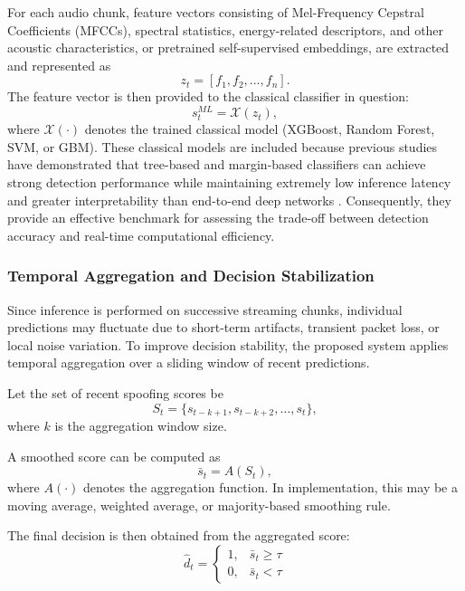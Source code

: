 For each audio chunk, feature vectors consisting of Mel-Frequency Cepstral Coefficients (MFCCs), spectral statistics, energy-related descriptors, and other acoustic characteristics, or pretrained self-supervised embeddings, are extracted and represented as
\begin{equation}
z_t = [f_1,f_2,\ldots,f_n].
\end{equation}
The feature vector is then provided to the classical classifier in question:
\begin{equation}
s_t^{ML} = \mathcal{X}(z_t),
\end{equation}
where $\mathcal{X}(\cdot)$ denotes the trained classical model (XGBoost, Random Forest, SVM, or GBM). These classical models are included because previous studies have demonstrated that tree-based and margin-based classifiers can achieve strong detection performance while maintaining extremely low inference latency and greater interpretability than end-to-end deep networks \cite{Bird2023}. Consequently, they provide an effective benchmark for assessing the trade-off between detection accuracy and real-time computational efficiency.

\subsubsection{Temporal Aggregation and Decision Stabilization}

Since inference is performed on successive streaming chunks, individual predictions may fluctuate due to short-term artifacts, transient packet loss, or local noise variation. To improve decision stability, the proposed system applies temporal aggregation over a sliding window of recent predictions.

Let the set of recent spoofing scores be
\begin{equation}
S_t = \{s_{t-k+1}, s_{t-k+2}, \ldots, s_t\},
\end{equation}
where \(k\) is the aggregation window size.

A smoothed score can be computed as
\begin{equation}
\bar{s}_t = A(S_t),
\end{equation}
where $A(\cdot)$ denotes the aggregation function. In implementation, this may be a moving average, weighted average, or majority-based smoothing rule.

The final decision is then obtained from the aggregated score:
\begin{equation}
\hat{d}_t =
\begin{cases}
1, & \bar{s}_t \geq \tau \\
0, & \bar{s}_t < \tau
\end{cases}
\end{equation}

